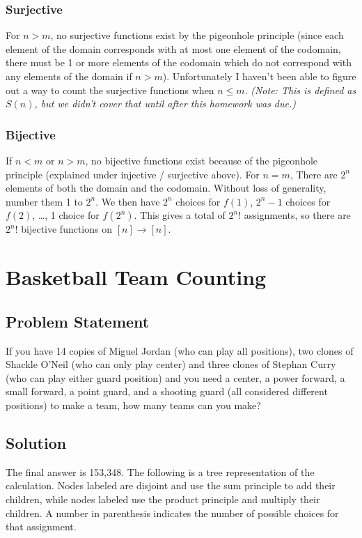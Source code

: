 \documentclass[12pt]{article}
\begin{document}
\subsubsection*{Surjective}
For $n > m$, no surjective functions exist by the pigeonhole principle (since each element of the domain corresponds with at most one element of the codomain, there must be 1 or more elements of the codomain which do not correspond with any elements of the domain if $n > m$). Unfortunately I haven't been able to figure out a way to count the surjective functions when $n \leq m$. \emph{(Note: This is defined as $S(n)$, but we didn't cover that until after this homework was due.)}

\subsubsection*{Bijective}

If $n < m$ or $n > m$, no bijective functions exist because of the pigeonhole principle (explained under injective / surjective above). For $n = m$, There are $2^n$ elements of both the domain and the codomain. Without loss of generality, number them 1 to $2^n$. We then have $2^n$ choices for $f(1)$, $2^n-1$ choices for $f(2)$, \ldots, 1 choice for $f(2^n)$. This gives a total of $2^n!$ assignments, so there are $2^n!$ bijective functions on $[n] \rightarrow [n]$.

\section{Basketball Team Counting}

\subsection*{Problem Statement}
If you have 14 copies of Miguel Jordan (who can play all positions), two clones of Shackle O'Neil (who can only play center) and three clones of Stephan Curry (who can play either guard position) and you need a center, a power forward, a small forward, a point guard, and a shooting guard (all considered different positions) to make a team, how many teams can you make?
\subsection*{Solution}

The final answer is 153,348. The following is a tree representation of the calculation. Nodes labeled  are disjoint and use the sum principle to add their children, while nodes labeled  use the product principle and multiply their children. A number in parenthesis indicates the number of possible choices for that assignment. 
\end{document}
